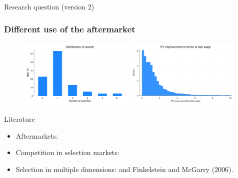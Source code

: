 \documentclass[notes, 10pt,aspectratio=169]{beamer}
\begin{document}
\begin{frame}{Research question (version 2)}
\begin{itemize}
\end{itemize}
\end{frame}




 


\begin{frame}
\frametitle{Different use of the aftermarket} 
\begin{figure}
    \centering
    \includegraphics[width=0.49\textwidth]{../figures/IE3_dist_external_offers.png}
    \hfill %
    \includegraphics[width=0.49\textwidth]{../figures/IE3_offer_improvement_histogram.png}
    \label{fig:my-figures}
\end{figure}
\end{frame}



\begin{frame}{Literature}

\begin{itemize}
    \item Aftermarkets: \textcite{larsen_efficiency_2021, allen_search_2019}

    \item Competition in selection markets: \textcite{mahoney_imperfect_2017, cuesta_price_2018}

    \item Selection in multiple dimensions: \textcite{finkelstein_adverse_2004} and Finkelstein and McGarry (2006).  
\end{itemize}
\end{frame}
\end{document}
